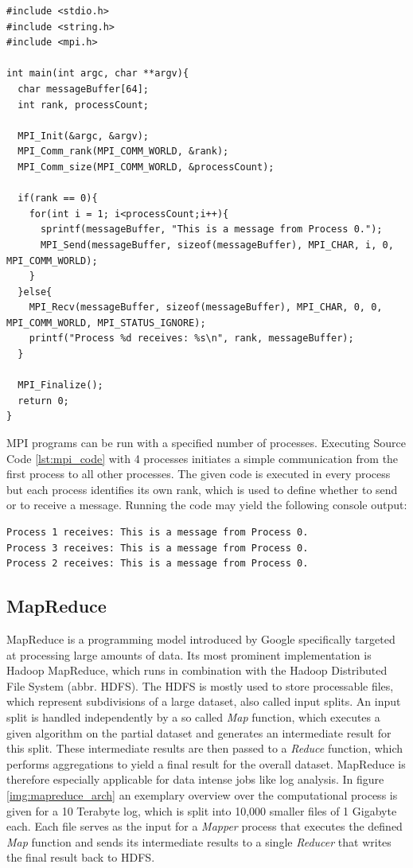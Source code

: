 \begin{lstlisting}[caption=MPI Code Example in C,captionpos=b,label=lst:mpi_code]
#include <stdio.h>
#include <string.h>
#include <mpi.h>

int main(int argc, char **argv){
  char messageBuffer[64];
  int rank, processCount;

  MPI_Init(&argc, &argv);
  MPI_Comm_rank(MPI_COMM_WORLD, &rank);
  MPI_Comm_size(MPI_COMM_WORLD, &processCount);

  if(rank == 0){
    for(int i = 1; i<processCount;i++){
      sprintf(messageBuffer, "This is a message from Process 0.");
      MPI_Send(messageBuffer, sizeof(messageBuffer), MPI_CHAR, i, 0, MPI_COMM_WORLD);
    }
  }else{
    MPI_Recv(messageBuffer, sizeof(messageBuffer), MPI_CHAR, 0, 0, MPI_COMM_WORLD, MPI_STATUS_IGNORE);
    printf("Process %d receives: %s\n", rank, messageBuffer);
  }

  MPI_Finalize();
  return 0;
}
\end{lstlisting}

MPI programs can be run with a specified number of processes. Executing Source Code \ref{lst:mpi_code} with 4 processes initiates a simple communication from the first process to all other processes. The given code is executed in every process but each process identifies its own rank, which is used to define whether to send or to receive a message. Running the code may yield the following console output:
\begin{Verbatim}[fontsize=\small]
Process 1 receives: This is a message from Process 0.
Process 3 receives: This is a message from Process 0.
Process 2 receives: This is a message from Process 0.
\end{Verbatim}

\subsection*{MapReduce}
MapReduce is a programming model introduced by Google specifically targeted at processing large amounts of data\cite{mapreduce}. Its most prominent implementation is Hadoop MapReduce, which runs in combination with the Hadoop Distributed File System (abbr. HDFS)\cite{hadoop_mapreduce}. The HDFS is mostly used to store processable files, which represent subdivisions of a large dataset, also called input splits. An input split is handled independently by a so called \textit{Map} function, which executes a given algorithm on the partial dataset and generates an intermediate result for this split. These intermediate results are then passed to a \textit{Reduce} function, which performs aggregations to yield a final result for the overall dataset. MapReduce is therefore especially applicable for data intense jobs like log analysis. In figure \ref{img:mapreduce_arch} an exemplary overview over the computational process is given for a 10 Terabyte log, which is split into 10,000 smaller files of 1 Gigabyte each. Each file serves as the input for a \textit{Mapper} process that executes the defined \textit{Map} function and sends its intermediate results to a single \textit{Reducer} that writes the final result back to HDFS.

